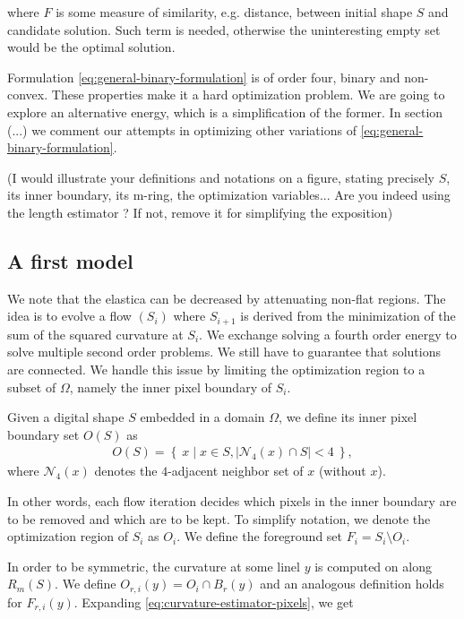 \documentclass[runningheads]{llncs}
\newcommand{\jaco}[1]{{\textcolor{green!50!black}{#1}}}
\begin{document}
where $F$ is some measure of similarity, e.g. distance, between initial shape $S$ and candidate solution. Such term is needed, otherwise the uninteresting empty set would be the optimal solution.

Formulation \eqref{eq:general-binary-formulation} is of order four, binary and non-convex. These properties make it a hard optimization problem. We are going to explore an alternative energy, which is a simplification of the \jaco{former}. In section (...) we comment our attempts in optimizing  other variations of \eqref{eq:general-binary-formulation}.

\jaco{(I would illustrate your definitions and notations on a figure, stating precisely $S$, its inner boundary, its m-ring, the optimization variables... Are you indeed using the length estimator ? If not, remove it for simplifying the exposition)}

\subsection{A first model}

We note that the elastica can be decreased by attenuating non-flat regions. The idea is to evolve a flow $(S_i)$ where $S_{i+1}$ is derived from the minimization of the sum of the squared curvature at $S_i$. We exchange solving a fourth order energy to solve multiple second order problems. We still have to guarantee that solutions are connected. We handle this issue by limiting the optimization region to a subset of $\Omega$, namely the inner pixel boundary of  $S_i$.

\begin{definition}
{
Given a digital shape $S$ embedded in a domain $\Omega$, we define its inner pixel boundary set $O(S)$ as
\begin{align*}
	O(S) = \left\{ \: x \; | \; x \in S, |\mathcal{N}_4(x) \cap S|<4 \: \right\},
\end{align*}
where $\mathcal{N}_4(x)$ denotes the $4$-adjacent neighbor set of $x$ (without $x$).
}
\end{definition}

In other words, each flow iteration decides which pixels in the inner boundary are to be removed and which are to be kept. To simplify notation, we denote the optimization region of $S_i$ as $O_i$. We define the foreground set $F_i = S_i \setminus O_i$.

In order to be symmetric, the curvature at some linel $y$ is computed on along $R_m(S)$. We define $O_{r,i}(y) = O_i \cap B_r(y)$ and an analogous definition holds for $F_{r,i}(y)$. Expanding \eqref{eq:curvature-estimator-pixels}, we get 
\end{document}

